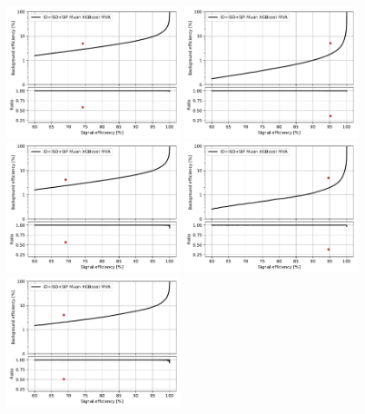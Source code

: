 \begin{figure}[!htb]
   \vspace*{0.3cm}
   \begin{center}
      \includegraphics[width=0.45\textwidth]{Figures/Muons/2016_pT_5.pdf}
      \includegraphics[width=0.45\textwidth]{Figures/Muons/2016_pT_10.pdf} \\
      \includegraphics[width=0.45\textwidth]{Figures/Muons/2017_pT_5.pdf}
      \includegraphics[width=0.45\textwidth]{Figures/Muons/2017_pT_10.pdf} \\
      \includegraphics[width=0.45\textwidth]{Figures/Muons/2018_pT_5.pdf}

\end{center}
\end{figure}

